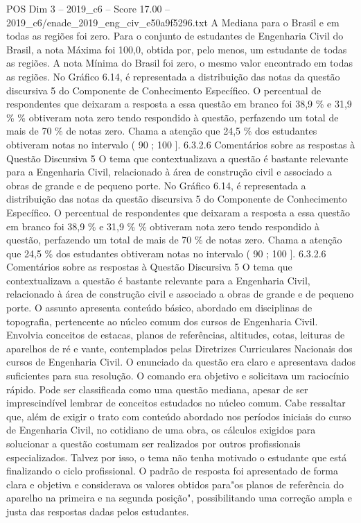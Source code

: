 \begin{textsample}{POS Dim 3 – 2019\_c6 – Score 17.00 – 2019\_c6/enade\_2019\_eng\_civ\_e50a9f5296.txt}
A Mediana para o Brasil e em todas as regiões foi zero.
Para o conjunto de estudantes de Engenharia Civil do Brasil, a nota Máxima foi 100,0, obtida por, pelo menos, um estudante de todas as regiões.
A nota Mínima do Brasil foi zero, o mesmo valor encontrado em todas as regiões.
No Gráfico 6.14, é representada a distribuição das notas da questão discursiva 5 do Componente de Conhecimento Específico.
O percentual de respondentes que deixaram a resposta a essa questão em branco foi 38,9 \% e 31,9 \% \% obtiveram nota zero tendo respondido à questão, perfazendo um total de mais de 70 \% de notas zero.
Chama a atenção que 24,5 \% dos estudantes obtiveram notas no intervalo ( 90 ; 100 ]. 6.3.2.6 Comentários sobre as respostas à Questão Discursiva 5 O tema que contextualizava a questão é bastante relevante para a Engenharia Civil, relacionado à área de construção civil e associado a obras de grande e de pequeno porte.
No Gráfico 6.14, é representada a distribuição das notas da questão discursiva 5 do Componente de Conhecimento Específico.
O percentual de respondentes que deixaram a resposta a essa questão em branco foi 38,9 \% e 31,9 \% \% obtiveram nota zero tendo respondido à questão, perfazendo um total de mais de 70 \% de notas zero.
Chama a atenção que 24,5 \% dos estudantes obtiveram notas no intervalo ( 90 ; 100 ]. 6.3.2.6 Comentários sobre as respostas à Questão Discursiva 5 O tema que contextualizava a questão é bastante relevante para a Engenharia Civil, relacionado à área de construção civil e associado a obras de grande e de pequeno porte.
O assunto apresenta conteúdo básico, abordado em disciplinas de topografia, pertencente ao núcleo comum dos cursos de Engenharia Civil.
Envolvia conceitos de estacas, planos de referências, altitudes, cotas, leituras de aparelhos de ré e vante, contemplados pelas Diretrizes Curriculares Nacionais dos cursos de Engenharia Civil.
O enunciado da questão era claro e apresentava dados suficientes para sua resolução.
O comando era objetivo e solicitava um raciocínio rápido.
Pode ser classificada como uma questão mediana, apesar de ser imprescindível lembrar de conceitos estudados no núcleo comum.
Cabe ressaltar que, além de exigir o trato com conteúdo abordado nos períodos iniciais do curso de Engenharia Civil, no cotidiano de uma obra, os cálculos exigidos para solucionar a questão costumam ser realizados por outros profissionais especializados.
Talvez por isso, o tema não tenha motivado o estudante que está finalizando o ciclo profissional.
O padrão de resposta foi apresentado de forma clara e objetiva e considerava os valores obtidos para"os planos de referência do aparelho na primeira e na segunda posição", possibilitando uma correção ampla e justa das respostas dadas pelos estudantes.

\end{textsample}
